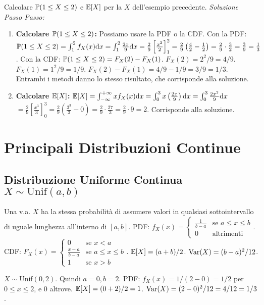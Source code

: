 \documentclass[12pt,a4paper]{article}
\begin{document}
\begin{example}
\begin{example}
Calcolare $\mathbb{P}(1 \le X \le 2)$ e $\mathbb{E}[X]$ per la $X$ dell'esempio precedente.
\textit{Soluzione Passo Passo:}
\begin{enumerate}
    \item \textbf{Calcolare $\mathbb{P}(1 \le X \le 2)$:}
    Possiamo usare la PDF o la CDF.
    Con la PDF: $\mathbb{P}(1 \le X \le 2) = \int_1^2 f_X(x) \mathrm{d} x = \int_1^2 \frac{2x}{9} \mathrm{d} x = \frac{2}{9} \left[ \frac{x^2}{2} \right]_1^2 = \frac{2}{9} \left( \frac{4}{2} - \frac{1}{2} \right) = \frac{2}{9} \cdot \frac{3}{2} = \frac{3}{9} = \frac{1}{3}$.
    Con la CDF: $\mathbb{P}(1 \le X \le 2) = F_X(2) - F_X(1)$.
    $F_X(2) = 2^2/9 = 4/9$.
    $F_X(1) = 1^2/9 = 1/9$.
    $F_X(2) - F_X(1) = 4/9 - 1/9 = 3/9 = 1/3$.
    Entrambi i metodi danno lo stesso risultato, che corrisponde alla soluzione.
    \item \textbf{Calcolare $\mathbb{E}[X]$:}
    $\mathbb{E}[X] = \int_{-\infty}^{+\infty} x f_X(x) \mathrm{d} x = \int_0^3 x \left(\frac{2x}{9}\right) \mathrm{d} x = \int_0^3 \frac{2x^2}{9} \mathrm{d} x$
    $= \frac{2}{9} \left[ \frac{x^3}{3} \right]_0^3 = \frac{2}{9} \left( \frac{3^3}{3} - 0 \right) = \frac{2}{9} \cdot \frac{27}{3} = \frac{2}{9} \cdot 9 = 2$.
    Corrisponde alla soluzione.
\end{enumerate}
\end{example}

\section{Principali Distribuzioni Continue}

\subsection{Distribuzione Uniforme Continua \texorpdfstring{$X \sim \text{Unif}(a,b)$}{X ~ Unif(a,b)}}
Una v.a. $X$ ha la stessa probabilità di assumere valori in qualsiasi sottointervallo di uguale lunghezza all'interno di $[a,b]$.
PDF: $f_X(x) = \begin{cases} \frac{1}{b-a} & \text{se } a \le x \le b \\ 0 & \text{altrimenti} \end{cases}$.
CDF: $F_X(x) = \begin{cases} 0 & \text{se } x < a \\ \frac{x-a}{b-a} & \text{se } a \le x \le b \\ 1 & \text{se } x > b \end{cases}$.
$\mathbb{E}[X] = (a+b)/2$.
$\mathrm{Var}(X) = (b-a)^2/12$.
\begin{example}[Esercizio 3, 17/07/2024]
$X \sim \text{Unif}(0,2)$.
Quindi $a=0, b=2$.
PDF: $f_X(x) = 1/(2-0) = 1/2$ per $0 \le x \le 2$, e 0 altrove.
$\mathbb{E}[X] = (0+2)/2 = 1$.
$\mathrm{Var}(X) = (2-0)^2/12 = 4/12 = 1/3$.
\end{example}


\end{example}
\end{document}
